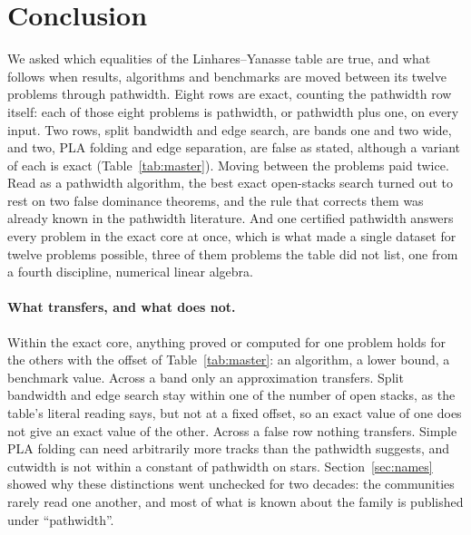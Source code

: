 \section{Conclusion}
\label{sec:closing}

We asked which equalities of the Linhares--Yanasse table are true, and what
follows when results, algorithms and benchmarks are moved between its twelve
problems through pathwidth. Eight rows are exact, counting the pathwidth row
itself: each of those eight problems is pathwidth, or pathwidth plus one, on
every input. Two rows, split bandwidth and edge search, are bands
one and two wide, and two, PLA folding and edge separation, are false as stated,
although a variant of each is exact (Table~\ref{tab:master}). Moving between
the problems paid twice. Read as a pathwidth algorithm, the best exact
open-stacks search turned out to rest on two false dominance theorems, and the
rule that corrects them was already known in the pathwidth literature. And one
certified pathwidth answers every problem in the exact core at once, which is
what made a single dataset for twelve problems possible, three of them
problems the table did not list, one from a fourth discipline, numerical
linear algebra.

\paragraph{What transfers, and what does not.} Within the exact core, anything
proved or computed for one problem holds for the others with the offset of
Table~\ref{tab:master}: an algorithm, a lower bound, a benchmark value. Across
a band only an approximation transfers. Split bandwidth and edge search stay
within one of the number of open stacks, as the table's literal reading says,
but not at a fixed offset, so an exact value of one does not give an exact
value of the other. Across a false row nothing transfers. Simple PLA folding
can need arbitrarily more tracks than the pathwidth suggests, and cutwidth is
not within a constant of pathwidth on stars. Section~\ref{sec:names} showed why
these distinctions went unchecked for two decades: the communities rarely read
one another, and most of what is known about the family is published under
``pathwidth''.

